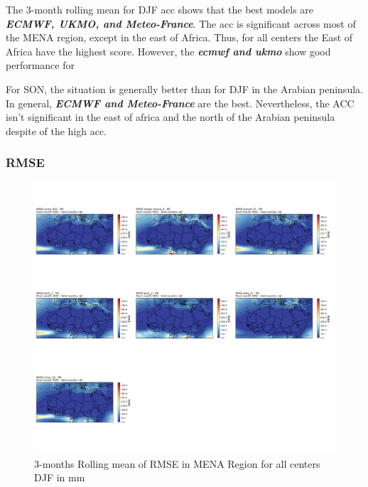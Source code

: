 The 3-month rolling mean for DJF acc shows that the best models are \textbf{\textit{ECMWF, UKMO, and Meteo-France}}. The acc is significant across most of the MENA region, except in the east of Africa. Thus, for all centers the East of Africa have the highest score. However, the \textbf{\textit{ecmwf and ukmo}} show good performance for 


 
For SON, the situation is generally better than for DJF in the Arabian peninsula. In general, \textbf{\textit{ECMWF and Meteo-France}} are the best. Nevertheless, the ACC isn't significant in the east of africa and the north of the Arabian peninsula despite of the high acc.


\subsubsection{RMSE}
 


\begin{figure}[H]
\centering
\includegraphics[scale=0.3]{plots/det/rmse/rmse_djf_RR.png}
\caption{3-months Rolling mean of RMSE in MENA Region for all centers DJF in mm}
\end{figure}

